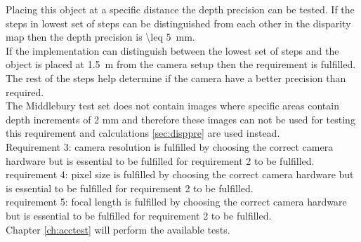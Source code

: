 Placing this object at a specific distance the depth precision can be tested. If the steps in lowest set of steps can be distinguished from each other in the disparity map then the depth precision is \SI{\leq 5}{\milli\meter}.\\
If the implementation can distinguish between the lowest set of steps and the object is placed at \SI{1.5}{\meter} from the camera setup then the requirement is fulfilled. The rest of the steps help determine if the camera have a better precision than required.\\
The Middlebury test set does not contain images where specific areas contain depth increments of 2 mm and therefore these images can not be used for testing this requirement and calculations \vref{sec:disppre} are used instead.\\

Requirement 3: camera resolution is fulfilled by choosing the correct camera hardware but is essential to be fulfilled for requirement 2 to be fulfilled.\\

requirement 4: pixel size is fulfilled by choosing the correct camera hardware but is essential to be fulfilled for requirement 2 to be fulfilled.\\

requirement 5: focal length is fulfilled by choosing the correct camera hardware but is essential to be fulfilled for requirement 2 to be fulfilled.\\

Chapter \vref{ch:acctest} will perform the available tests.
